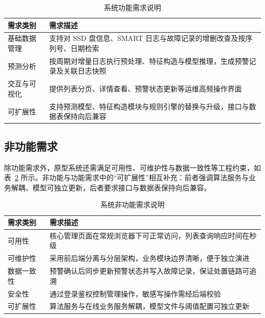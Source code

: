 \begin{table}[htbp]
    \centering
    \setlength{\tabcolsep}{6pt}
    \caption{\label{tab:sw-func-req}系统功能需求说明}
    \begin{tabularx}{\linewidth}{l X}
        \toprule
        需求类别 & 需求描述 \\
        \midrule
        基础数据管理 & 支持对 SSD 盘信息、SMART 日志与故障记录的增删改查及按序列号、日期检索 \\
        预测分析 & 按周期对增量日志执行预处理、特征构造与模型推理，生成预警记录及关联日志快照 \\
        交互与可视化 & 提供列表分页、详情查看、预警状态更新等运维高频操作界面 \\
        可扩展性 & 支持预测模型、特征构造模块与规则引擎的替换与升级，接口与数据表保持向后兼容 \\
        \bottomrule
    \end{tabularx}
\end{table}

\subsection{非功能需求}

除功能需求外，原型系统还需满足可用性、可维护性与数据一致性等工程约束，如表~\ref{tab:sw-nfr} 所示。非功能与功能需求中的“可扩展性”相互补充：前者强调算法服务与业务解耦、模型可独立更新，后者要求接口与数据表保持向后兼容。

\begin{table}[htbp]
    \centering
    \setlength{\tabcolsep}{6pt}
    \caption{\label{tab:sw-nfr}系统非功能需求说明}
    \begin{tabularx}{\linewidth}{l X}
        \toprule
        需求类别 & 需求描述 \\
        \midrule
        可用性 & 核心管理页面在常规浏览器下可正常访问，列表查询响应时间在秒级 \\
        可维护性 & 采用前后端分离与分层架构，业务模块边界清晰，便于独立演进 \\
        数据一致性 & 预警确认后同步更新预警状态并写入故障记录，保证处置链路可追溯 \\
        安全性 & 通过登录鉴权控制管理操作，敏感写操作需经后端校验 \\
        可扩展性 & 算法服务与在线业务服务解耦，模型文件与阈值配置可独立更新 \\
        \bottomrule
    \end{tabularx}
\end{table}

